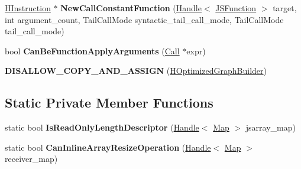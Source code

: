 \begin{DoxyCompactItemize}
\item 
\hyperlink{classv8_1_1internal_1_1_h_instruction}{H\+Instruction} $\ast$ {\bfseries New\+Call\+Constant\+Function} (\hyperlink{classv8_1_1internal_1_1_handle}{Handle}$<$ \hyperlink{classv8_1_1internal_1_1_j_s_function}{J\+S\+Function} $>$ target, int argument\+\_\+count, Tail\+Call\+Mode syntactic\+\_\+tail\+\_\+call\+\_\+mode, Tail\+Call\+Mode tail\+\_\+call\+\_\+mode)\hypertarget{classv8_1_1internal_1_1_h_optimized_graph_builder_aab035b57bb6aa1480cb1cd0fefde4d32}{}\label{classv8_1_1internal_1_1_h_optimized_graph_builder_aab035b57bb6aa1480cb1cd0fefde4d32}

\item 
bool {\bfseries Can\+Be\+Function\+Apply\+Arguments} (\hyperlink{classv8_1_1internal_1_1_call}{Call} $\ast$expr)\hypertarget{classv8_1_1internal_1_1_h_optimized_graph_builder_a8ff706f5c5155c2b7129035da249541b}{}\label{classv8_1_1internal_1_1_h_optimized_graph_builder_a8ff706f5c5155c2b7129035da249541b}

\item 
{\bfseries D\+I\+S\+A\+L\+L\+O\+W\+\_\+\+C\+O\+P\+Y\+\_\+\+A\+N\+D\+\_\+\+A\+S\+S\+I\+GN} (\hyperlink{classv8_1_1internal_1_1_h_optimized_graph_builder}{H\+Optimized\+Graph\+Builder})\hypertarget{classv8_1_1internal_1_1_h_optimized_graph_builder_af8fd59cdb9a5c95598cb061dac895799}{}\label{classv8_1_1internal_1_1_h_optimized_graph_builder_af8fd59cdb9a5c95598cb061dac895799}

\end{DoxyCompactItemize}
\subsection*{Static Private Member Functions}
\begin{DoxyCompactItemize}
\item 
static bool {\bfseries Is\+Read\+Only\+Length\+Descriptor} (\hyperlink{classv8_1_1internal_1_1_handle}{Handle}$<$ \hyperlink{classv8_1_1internal_1_1_map}{Map} $>$ jsarray\+\_\+map)\hypertarget{classv8_1_1internal_1_1_h_optimized_graph_builder_a951571bb201859e8a278966196ed02b5}{}\label{classv8_1_1internal_1_1_h_optimized_graph_builder_a951571bb201859e8a278966196ed02b5}

\item 
static bool {\bfseries Can\+Inline\+Array\+Resize\+Operation} (\hyperlink{classv8_1_1internal_1_1_handle}{Handle}$<$ \hyperlink{classv8_1_1internal_1_1_map}{Map} $>$ receiver\+\_\+map)\hypertarget{classv8_1_1internal_1_1_h_optimized_graph_builder_aaea18a3f8e6e5c7da7bad51fb3918f4b}{}\label{classv8_1_1internal_1_1_h_optimized_graph_builder_aaea18a3f8e6e5c7da7bad51fb3918f4b}

\end{DoxyCompactItemize}
